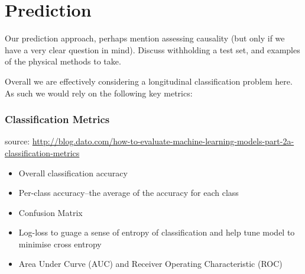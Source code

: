 \documentclass{article}
\begin{document}
%

\section{Prediction}

Our prediction approach, perhaps mention assessing causality (but only if we 
have a very clear question in mind). Discuss withholding a test set, and 
examples of the physical methods to take.

\noindent Overall we are effectively considering a longitudinal classification
problem here. As such we would rely on the following key metrics:

\subsubsection{Classification Metrics}
source: \url{http://blog.dato.com/how-to-evaluate-machine-learning-models-part-2a-classification-metrics}
\begin{itemize}
  \item  Overall classification accuracy
  \item  Per-class accuracy--the average of the accuracy for each class
  \item  Confusion Matrix
  \item  Log-loss to guage a sense of entropy of classification and help tune 
         model to minimise cross entropy
  \item  Area Under Curve (AUC) and Receiver Operating Characteristic (ROC)
\end{itemize}
\end{document}
